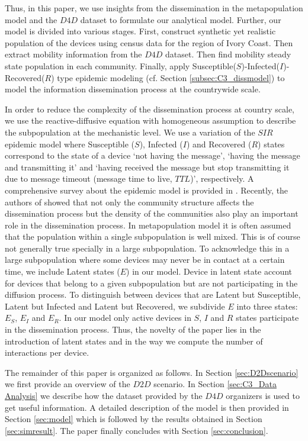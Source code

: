 \documentclass[review]{elsarticle}
\begin{document}
Thus, in this paper, we use insights from the dissemination in the metapopulation model and the $D4D$ dataset to formulate our analytical model. Further, our model is divided into various stages. First, construct synthetic yet realistic population of the devices using census data \cite{Web1} for the region of Ivory Coast. Then extract mobility information from the $D4D$ dataset. Then find mobility steady state population in each community. Finally, apply Susceptible($S$)-Infected($I$)-Recovered($R$) type epidemic modeling (cf. Section \ref{subsec:C3_dissmodel}) to model the information dissemination process at the countrywide scale.

In order to reduce the complexity of the dissemination process at country scale, we use the reactive-diffusive equation with homogeneous assumption to describe the subpopulation at the mechanistic level. We use a variation of the $SIR$ epidemic model where Susceptible ($S$), Infected ($I$) and Recovered ($R$) states correspond to the state of a device `not having the message', `having the message and transmitting it' and `having received the message but stop transmitting it due to message timeout (message time to live, $TTL$)', respectively. A comprehensive survey about the epidemic model is provided in \cite{Hethcote2000,Britton2010}. Recently, the authors of \cite{Lund2013} showed that not only the community structure affects the dissemination process but the density of the communities also play an important role in the dissemination process. In metapopulation model it is often assumed that the population within a single subpopulation is well mixed. This is of course not generally true specially in a large subpopulation. To acknowledge this in a large subpopulation where some devices may never be in contact at a certain time, we include Latent states ($E$) in our model. Device in latent state account for devices that belong to a given subpopulation but are not participating in the diffusion process. To distinguish between devices that are Latent but Susceptible, Latent but Infected and Latent but Recovered, we subdivide $E$ into three states: $E_{S}$, $E_{I}$ and $E_{R}$. In our model only active devices in $S$, $I$ and $R$ states participate in the dissemination process. Thus, the novelty of the paper lies in the introduction of latent states and in the way we compute the number of interactions per device.

The remainder of this paper is organized as follows. In Section \ref{sec:D2Dscenario} we first provide an overview of the $D2D$ scenario. In Section \ref{sec:C3_Data Analysis} we describe how the dataset provided by the $D4D$ organizers is used to get useful information. A detailed description of the model is then provided in Section \ref{sec:model} which is followed by the results obtained in Section \ref{sec:simresult}. The paper finally concludes with Section \ref{sec:conclusion}.
\end{document}
